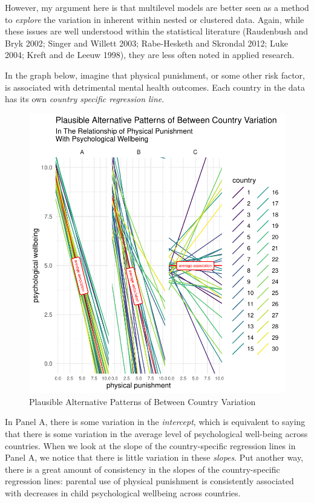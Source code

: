 \documentclass[
  letterpaper,
  DIV=11,
  numbers=noendperiod]{scrreprt}
\begin{document}
However, my argument here is that multilevel models are better seen as a
method to \emph{explore} the variation in inherent within nested or
clustered data. Again, while these issues are well understood within the
statistical literature (Raudenbush and Bryk 2002; Singer and Willett
2003; Rabe-Hesketh and Skrondal 2012; Luke 2004; Kreft and de Leeuw
1998), they are less often noted in applied research.

In the graph below, imagine that physical punishment, or some other risk
factor, is associated with detrimental mental health outcomes. Each
country in the data has its own \emph{country specific regression line}.

\begin{figure}

{\centering \includegraphics{./intro_files/figure-pdf/fig-variation1-1.pdf}

}

\caption{\label{fig-variation1}Plausible Alternative Patterns of Between
Country Variation}

\end{figure}

In Panel A, there is some variation in the \emph{intercept}, which is
equivalent to saying that there is some variation in the average level
of psychological well-being across countries. When we look at the slope
of the country-specific regression lines in Panel A, we notice that
there is little variation in these \emph{slopes}. Put another way, there
is a great amount of consistency in the slopes of the country-specific
regression lines: parental use of physical punishment is consistently
associated with decreases in child psychological wellbeing across
countries.
\end{document}

